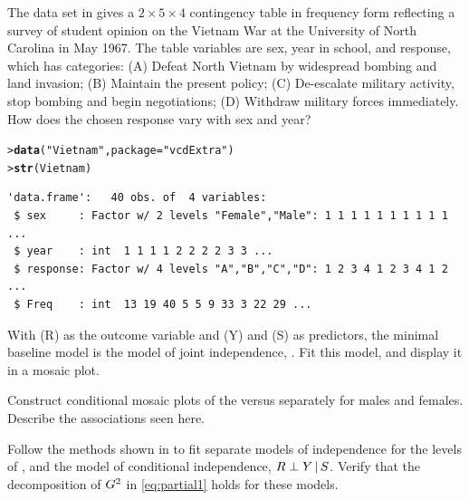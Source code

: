 \documentclass[10pt]{report}\usepackage[]{graphicx}\usepackage[]{color}
\makeatletter
\newcommand{\hlstr}[1]{\textcolor[rgb]{0.192,0.494,0.8}{#1}}%
\newcommand{\hlstd}[1]{\textcolor[rgb]{0.345,0.345,0.345}{#1}}%
\newcommand{\hlkwc}[1]{\textcolor[rgb]{0.333,0.667,0.333}{#1}}%
\newcommand{\hlkwd}[1]{\textcolor[rgb]{0.737,0.353,0.396}{\textbf{#1}}}%
\newenvironment{kframe}{%
 \def\at@end@of@kframe{}%
 \ifinner\ifhmode%
  \def\at@end@of@kframe{\end{minipage}}%
  \begin{minipage}{\columnwidth}%
 \fi\fi%
 \def\FrameCommand##1{\hskip\@totalleftmargin \hskip-\fboxsep
 \colorbox{shadecolor}{##1}\hskip-\fboxsep
     \hskip-\linewidth \hskip-\@totalleftmargin \hskip\columnwidth}%
 \MakeFramed {\advance\hsize-\width
   \@totalleftmargin\z@ \linewidth\hsize
   \@setminipage}}%
 {\par\unskip\endMakeFramed%
 \at@end@of@kframe}
\newenvironment{knitrout}{}{} %
\renewenvironment{knitrout}{\small\renewcommand{\baselinestretch}{.85}}{} %
\makeatother
\begin{document}
\begin{Exercises}
\begin{enumerate*}
    \end{enumerate*}

  \exercise\label{lab:mosaic-vietnam}The data set  in  gives a $2 \times 5 \times 4$ contingency table in frequency form reflecting a survey of student opinion on the Vietnam War at the University of North Carolina in May 1967.  
  The table variables are sex, year in school, and response, which has categories: (A) Defeat North Vietnam by widespread bombing and land invasion; (B) Maintain the present policy; (C) De-escalate military activity, stop bombing and begin negotiations; (D) Withdraw military forces immediately.  How does the chosen response vary with sex and year?
\begin{knitrout}\footnotesize
{}\color{fgcolor}\begin{kframe}
\begin{alltt}
\hlstd{> }\hlkwd{data}\hlstd{(}\hlstr{"Vietnam"}\hlstd{,} \hlkwc{package} \hlstd{=} \hlstr{"vcdExtra"}\hlstd{)}
\hlstd{> }\hlkwd{str}\hlstd{(Vietnam)}
\end{alltt}
\begin{verbatim}
'data.frame':	40 obs. of  4 variables:
 $ sex     : Factor w/ 2 levels "Female","Male": 1 1 1 1 1 1 1 1 1 1 ...
 $ year    : int  1 1 1 1 2 2 2 2 3 3 ...
 $ response: Factor w/ 4 levels "A","B","C","D": 1 2 3 4 1 2 3 4 1 2 ...
 $ Freq    : int  13 19 40 5 5 9 33 3 22 29 ...
\end{verbatim}
\end{kframe}
\end{knitrout}
    \begin{enumerate*}
      \item With  (R) as the outcome variable and  (Y) and  (S) as predictors, the minimal
      baseline \loglin model is the model of joint independence, .  Fit this model, and display it in
      a mosaic plot.
      \begin{ans}
      \end{ans}
      
      \item Construct conditional mosaic plots of the  versus  separately for males and females.
      Describe the associations seen here.
      \begin{ans}
      \end{ans}
      
      \item Follow the methods shown in  to fit separate models of independence for the levels of ,
      and the model of conditional independence, $R \perp Y \, | \, S$.
      Verify that the decomposition of $G^2$ in \eqref{eq:partial1} holds for these models.
      \begin{ans}
      \end{ans}
      

\end{enumerate*}
\end{Exercises}
\end{document}
